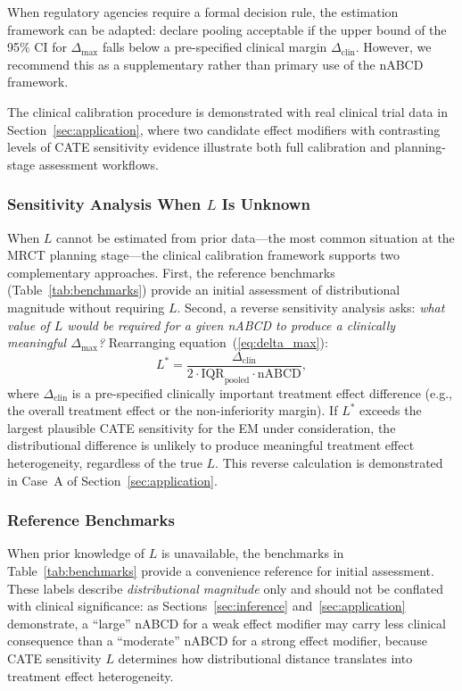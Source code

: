 \documentclass[AMA,Times1COL]{WileyNJDv5}
\begin{document}
When regulatory agencies require a formal decision rule, the estimation framework can be adapted: declare pooling acceptable if the upper bound of the 95\% CI for $\Delta_{\max}$ falls below a pre-specified clinical margin $\Delta_{\text{clin}}$. However, we recommend this as a supplementary rather than primary use of the nABCD framework.

The clinical calibration procedure is demonstrated with real clinical trial data in Section~\ref{sec:application}, where two candidate effect modifiers with contrasting levels of CATE sensitivity evidence illustrate both full calibration and planning-stage assessment workflows.

\subsubsection{Sensitivity Analysis When $L$ Is Unknown}\label{sec:sensitivity}

When $L$ cannot be estimated from prior data---the most common situation at the MRCT planning stage---the clinical calibration framework supports two complementary approaches. First, the reference benchmarks (Table~\ref{tab:benchmarks}) provide an initial assessment of distributional magnitude without requiring $L$. Second, a reverse sensitivity analysis asks: \emph{what value of $L$ would be required for a given nABCD to produce a clinically meaningful $\Delta_{\max}$?} Rearranging equation~(\ref{eq:delta_max}):
\begin{equation}
L^* = \frac{\Delta_{\text{clin}}}{2 \cdot \text{IQR}_{\text{pooled}} \cdot \text{nABCD}},
\label{eq:lstar}
\end{equation}
where $\Delta_{\text{clin}}$ is a pre-specified clinically important treatment effect difference (e.g., the overall treatment effect or the non-inferiority margin). If $L^*$ exceeds the largest plausible CATE sensitivity for the EM under consideration, the distributional difference is unlikely to produce meaningful treatment effect heterogeneity, regardless of the true $L$. This reverse calculation is demonstrated in Case~A of Section~\ref{sec:application}.

\subsubsection{Reference Benchmarks}

When prior knowledge of $L$ is unavailable, the benchmarks in Table~\ref{tab:benchmarks} provide a convenience reference for initial assessment. These labels describe \emph{distributional magnitude} only and should not be conflated with clinical significance: as Sections~\ref{sec:inference} and~\ref{sec:application} demonstrate, a ``large'' nABCD for a weak effect modifier may carry less clinical consequence than a ``moderate'' nABCD for a strong effect modifier, because CATE sensitivity $L$ determines how distributional distance translates into treatment effect heterogeneity.
\end{document}
